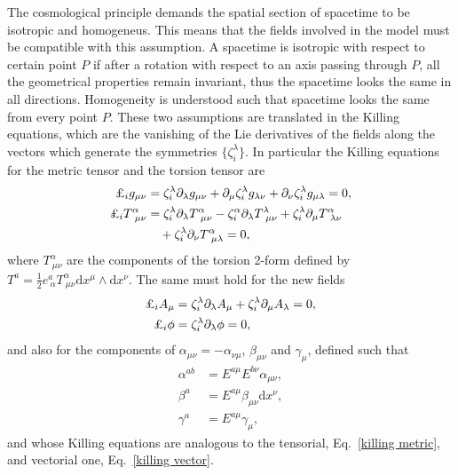 \documentclass[aps,prd,12pt,superscriptaddress,showpacs,showkeys,longbibliography,reprint,nofootinbib]{revtex4-1}
\begin{document}
The cosmological principle demands the spatial section of spacetime to be isotropic and homogeneus. This means that the fields involved in the model must be compatible with this assumption. A spacetime is isotropic with respect to certain point $P$ if after a rotation with respect to an axis passing through $P$, all the geometrical properties remain invariant, thus the spacetime looks the same in all directions. Homogeneity is understood such that spacetime looks the same from every point $P$. These two assumptions are translated in the Killing equations, which are the vanishing of the Lie derivatives of the fields along the vectors which generate the symmetries $\{\zeta^\lambda_{i}\}$. In particular the Killing equations for the metric tensor and the torsion tensor are
\begin{align}
  \label{killing metric}
  \text{\textsterling}_i g_{\mu\nu}&=\zeta^\lambda_i\partial_\lambda g_{\mu\nu}+\partial_\mu\zeta^\lambda_i g_{\lambda\nu}+\partial_\nu\zeta^\lambda_i g_{\mu\lambda}=0,
  \\
  \text{\textsterling}_i T^\alpha_{\ \mu\nu}&=\zeta^\lambda_i\partial_\lambda T^\alpha_{\ \mu\nu}-\zeta^\alpha_i\partial_\lambda T^\lambda_{\ \mu\nu}
  +\zeta^\lambda_i\partial_\mu T^\alpha_{\ \lambda\nu} \notag \\
  &\quad +\zeta^\lambda_i\partial_\nu T^\alpha_{\ \mu\lambda}=0,
\end{align}
where $T^\alpha_{\ \mu\nu}$ are the components of the torsion 2-form defined by $T^a=\frac{1}{2}e^a_{\ \alpha}T^\alpha_{\ \mu\nu}\mbox{d}x^\mu\wedge\mbox{d}x^\nu$. The same must hold for the new fields
\begin{align}
  \label{killing vector}
  \text{\textsterling}_i A_\mu&=\zeta^\lambda_i\partial_\lambda A_\mu+\zeta^\lambda_i\partial_\mu A_\lambda=0,\\
  \text{\textsterling}_i \phi &=\zeta^\lambda_i\partial_\lambda\phi=0,
\end{align}
and also for the components of $\alpha_{\mu\nu}=-\alpha_{\nu\mu}$, $\beta_{\mu\nu}$ and $\gamma_\mu$, defined such that
\begin{align*}
  \alpha^{ab}&=E^{a\mu}E^{b\nu}\alpha_{\mu\nu},\\
  \beta^a&=E^{a\mu}\beta_{\mu\nu}\mbox{d}x^\nu,\\
  \gamma^a&=E^{a\mu}\gamma_\mu,
\end{align*} 
and whose Killing equations are analogous to the tensorial, Eq.~\eqref{killing metric}, and vectorial one, Eq.~\eqref{killing vector}.
\end{document}
